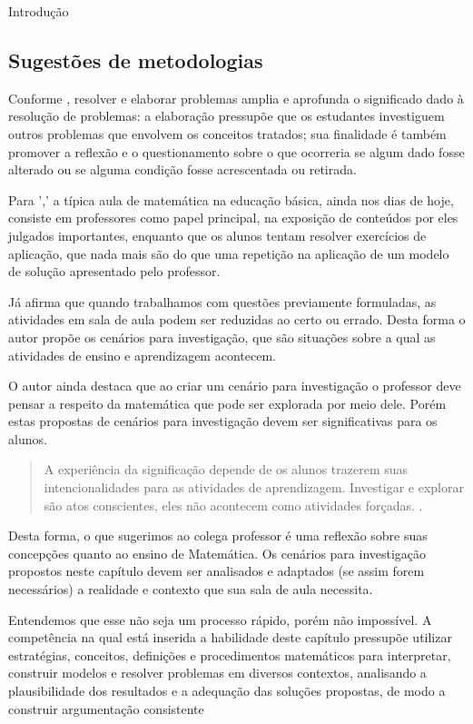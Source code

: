 \begin{apresentacao}{Introdução}
  \subsection{Sugestões de metodologias}

  Conforme \citet{BNCC2019}, resolver e elaborar problemas amplia e aprofunda o significado dado à resolução de problemas: a elaboração pressupõe que os estudantes investiguem outros problemas que envolvem os conceitos tratados; sua finalidade é também promover a reflexão e o questionamento sobre o que ocorreria se algum dado fosse alterado ou se alguma condição fosse acrescentada ou retirada.

  Para \citet{dambrosio1989}',' a típica aula de matemática na educação básica, ainda nos dias de hoje, consiste em professores como papel principal, na exposição de conteúdos por eles julgados importantes, enquanto que os alunos tentam resolver exercícios de aplicação, que nada mais são do que uma repetição na aplicação de um modelo de solução apresentado pelo professor.

  Já \citet{skovsmose2014} afirma que quando trabalhamos com questões previamente formuladas, as atividades em sala de aula podem ser reduzidas ao certo ou errado. Desta forma o autor propõe os cenários para investigação, que são situações sobre a qual as atividades de ensino e aprendizagem acontecem.

  O autor ainda destaca que ao criar um cenário para investigação o professor deve pensar a respeito da matemática que pode ser explorada por meio dele. Porém estas propostas de cenários para investigação devem ser significativas para os alunos.
  \columnbreak
  \begin{quote}
  A experiência da significação depende de os alunos trazerem suas intencionalidades para as atividades de aprendizagem. Investigar e explorar são atos conscientes, eles não acontecem como atividades forçadas. \citep[p. 60]{skovsmose2014}.
  \end{quote}
  Desta forma, o que sugerimos ao colega professor é uma reflexão sobre suas concepções quanto ao ensino de Matemática. Os cenários para investigação propostos neste capítulo devem ser analisados e adaptados (se assim forem necessários) a realidade e contexto que sua sala de aula necessita.

  Entendemos que esse não seja um processo rápido, porém não impossível. A competência na qual está inserida a habilidade deste capítulo pressupõe utilizar estratégias, conceitos, definições e procedimentos matemáticos para interpretar, construir modelos e resolver problemas em diversos contextos, analisando a plausibilidade dos resultados e a adequação das soluções propostas, de modo a construir argumentação consistente \citep[p. 535]{BNCC2019}


\end{apresentacao}
